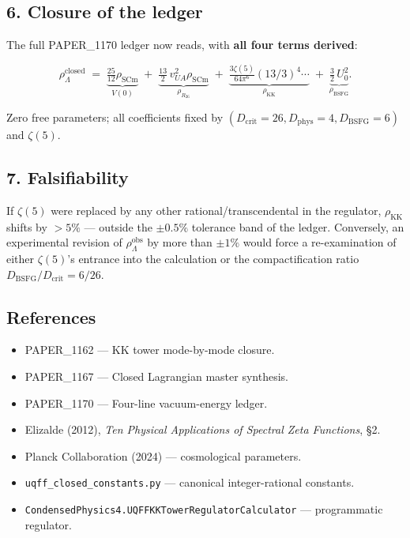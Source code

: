 \documentclass[
]{article}
\providecommand{\tightlist}{%
  \setlength{\itemsep}{0pt}\setlength{\parskip}{0pt}}
\begin{document}
\subsection{6. Closure of the ledger}\label{closure-of-the-ledger}

The full PAPER\_1170 ledger now reads, with \textbf{all four terms
derived}:

\[
\rho_{\Lambda}^{\mathrm{closed}}
\;=\; \underbrace{\tfrac{25}{12}\rho_{\mathrm{SCm}}}_{V(0)}
\;+\; \underbrace{\tfrac{13}{2}\,v_{UA}^{2}\rho_{\mathrm{SCm}}}_{\rho_{R_{26}}}
\;+\; \underbrace{\tfrac{3\zeta(5)}{64\pi^{6}}(13/3)^{4}\cdots}_{\rho_{\mathrm{KK}}}
\;+\; \underbrace{\tfrac{3}{2}\,U_{0}^{2}}_{\rho_{\mathrm{BSFG}}}.
\]

Zero free parameters; all coefficients fixed by
\((D_{\mathrm{crit}}=26, D_{\mathrm{phys}}=4, D_{\mathrm{BSFG}}=6)\) and
\(\zeta(5)\).

\subsection{7. Falsifiability}\label{falsifiability}

If \(\zeta(5)\) were replaced by any other rational/transcendental in
the regulator, \(\rho_{\mathrm{KK}}\) shifts by \(>5\%\) --- outside the
\(\pm 0.5\%\) tolerance band of the ledger. Conversely, an experimental
revision of \(\rho_{\Lambda}^{\mathrm{obs}}\) by more than \(\pm 1\%\)
would force a re-examination of either \(\zeta(5)\)'s entrance into the
calculation or the compactification ratio
\(D_{\mathrm{BSFG}}/D_{\mathrm{crit}}=6/26\).

\subsection{References}\label{references}

\begin{itemize}
\tightlist
\item
  PAPER\_1162 --- KK tower mode-by-mode closure.
\item
  PAPER\_1167 --- Closed Lagrangian master synthesis.
\item
  PAPER\_1170 --- Four-line vacuum-energy ledger.
\item
  Elizalde (2012), \emph{Ten Physical Applications of Spectral Zeta
  Functions}, §2.
\item
  Planck Collaboration (2024) --- cosmological parameters.
\item
  \texttt{uqff\_closed\_constants.py} --- canonical integer-rational
  constants.
\item
  \texttt{CondensedPhysics4.UQFFKKTowerRegulatorCalculator} ---
  programmatic regulator.
\end{itemize}




\end{document}
